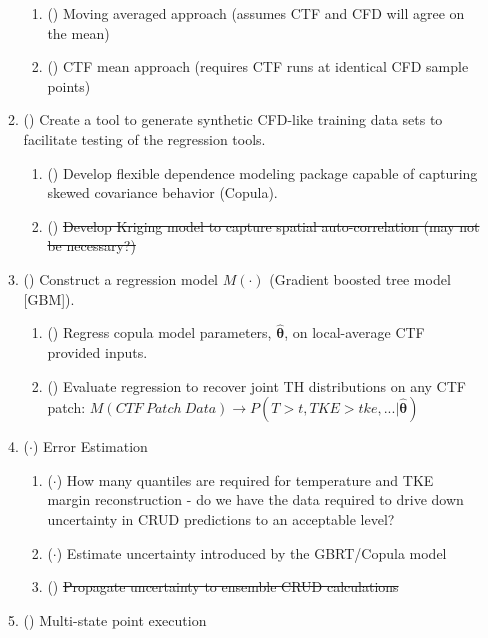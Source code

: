 \begin{enumerate}
\begin{enumerate}
        \begin{enumerate}
            \item (\checkmark) Moving averaged approach (assumes CTF and CFD will agree on the mean)
            \item (\checkmark) CTF mean approach (requires CTF runs at identical CFD sample points)
        \end{enumerate}
        \item (\checkmark) Create a tool to generate synthetic CFD-like training data sets to facilitate
            testing of the regression tools.
        \begin{enumerate}
            \item (\checkmark) Develop flexible dependence modeling package capable of capturing skewed covariance behavior (Copula).
            \item (\xmark) \sout{Develop Kriging model to capture spatial auto-correlation (may not be necessary?)}
        \end{enumerate}
        \item (\checkmark) Construct a regression model $M(\cdot)$ (Gradient boosted tree model [GBM]).
        \begin{enumerate}
            \item (\checkmark) Regress copula model parameters, $\bm{\hat\theta}$, on local-average CTF provided inputs.
            \item (\checkmark) Evaluate regression to recover joint TH distributions on any CTF patch:
                $M(CTF\ Patch\ Data) \rightarrow {P(T>t,TKE>tke,...|\bm{\hat\theta})}$
        \end{enumerate}
        \item ($\cdot$) Error Estimation
        \begin{enumerate}
        	\item ($\cdot$) How many quantiles are required for temperature and TKE margin reconstruction
                                - do we have the data required to drive down uncertainty in CRUD predictions to an acceptable level?
            \item ($\cdot$) Estimate uncertainty introduced by the GBRT/Copula model
            \item (\xmark) \sout{Propagate uncertainty to ensemble CRUD calculations}
        \end{enumerate}
        \item (\checkmark) Multi-state point execution

\end{enumerate}
\end{enumerate}
